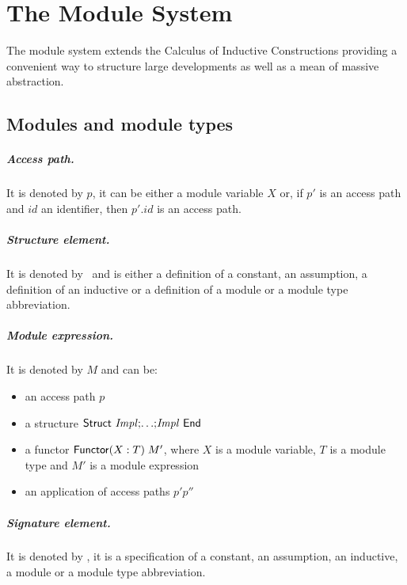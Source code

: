 \chapter[The Module System]{The Module System\label{chapter:Modules}}

The module system extends the Calculus of Inductive Constructions
providing a convenient way to structure large developments as well as
a mean of massive abstraction.

\section{Modules and module types}

\paragraph{Access path.} It is denoted by $p$, it can be either a module 
variable $X$ or, if $p'$ is an access path and $id$ an identifier, then
$p'.id$ is an access path.

\paragraph{Structure element.} It is denoted by \Impl\ and is either a
definition of a constant, an assumption, a definition of an inductive
or a definition of a module or a module type abbreviation.

\paragraph{Module expression.} It is denoted by $M$ and can be:
\begin{itemize}
\item an access path $p$
\item a structure ${\sf Struct}~{{\it Impl}} {\tt ;} {\ldots} {\tt ;} {{\it Impl}}~{\sf End}$
\item a functor ${\sf Functor}(X:T)\;M'$, where $X$ is a module variable,
  $T$ is a module type and $M'$ is a module expression
\item an application of access paths $p' p''$
\end{itemize}

\paragraph{Signature element.} It is denoted by \Spec, it is a
specification of a constant, an assumption, an inductive, a module or
a module type abbreviation.


